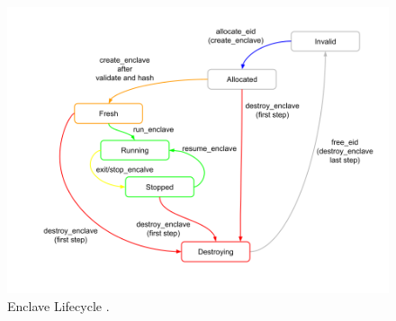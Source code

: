 \begin{figure}[h!]
    \centering
    \includegraphics[scale=0.45]{./chapters/images/Enclave lifecycle.png}
    \caption{Enclave Lifecycle \cite{keystone-doc}.}
    \label{enclave-lifecycle}
\end{figure}